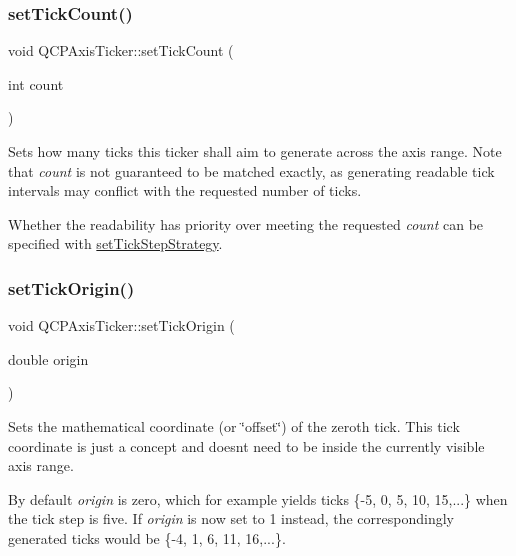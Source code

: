 \subsubsection{\texorpdfstring{set\+Tick\+Count()}{setTickCount()}}
{\footnotesize\ttfamily void Q\+C\+P\+Axis\+Ticker\+::set\+Tick\+Count (\begin{DoxyParamCaption}\item[{int}]{count }\end{DoxyParamCaption})}

Sets how many ticks this ticker shall aim to generate across the axis range. Note that {\itshape count} is not guaranteed to be matched exactly, as generating readable tick intervals may conflict with the requested number of ticks.

Whether the readability has priority over meeting the requested {\itshape count} can be specified with \mbox{\hyperlink{class_q_c_p_axis_ticker_a73b1d847c1a12159af6bfda4ebebe7d5}{set\+Tick\+Step\+Strategy}}. \mbox{\label{class_q_c_p_axis_ticker_ab509c7e500293bf66a8409f0d7c23943}} 
\subsubsection{\texorpdfstring{set\+Tick\+Origin()}{setTickOrigin()}}
{\footnotesize\ttfamily void Q\+C\+P\+Axis\+Ticker\+::set\+Tick\+Origin (\begin{DoxyParamCaption}\item[{double}]{origin }\end{DoxyParamCaption})}

Sets the mathematical coordinate (or \char`\"{}offset\char`\"{}) of the zeroth tick. This tick coordinate is just a concept and doesn\textquotesingle{}t need to be inside the currently visible axis range.

By default {\itshape origin} is zero, which for example yields ticks \{-\/5, 0, 5, 10, 15,...\} when the tick step is five. If {\itshape origin} is now set to 1 instead, the correspondingly generated ticks would be \{-\/4, 1, 6, 11, 16,...\}. \mbox{\label{class_q_c_p_axis_ticker_a73b1d847c1a12159af6bfda4ebebe7d5}} 
